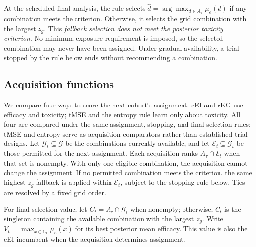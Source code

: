 \documentclass[11pt]{article}
\newcommand{\rev}[1]{{#1}}
\begin{document}
At the scheduled final analysis, the rule selects \rev{$\hat d=\arg\max_{d\in A_\tau}\mu_e(d)$} if any combination meets the criterion. Otherwise, it selects the grid combination with the largest $z_g$. This \emph{fallback selection does not meet the posterior toxicity criterion}. No minimum-exposure requirement is imposed, so the selected combination may never have been assigned. \rev{Under gradual availability, a trial stopped by the rule below ends without recommending a combination.}

\subsection{\rev{Acquisition functions}}\label{sec:policies}

We compare four ways to score the next cohort's assignment. cEI and cKG use efficacy and toxicity; tMSE and the entropy rule learn only about toxicity. \rev{All four are compared under the same assignment, stopping, and final-selection rules; tMSE and entropy serve as acquisition comparators rather than established trial designs.} \rev{Let $\mathcal G_t\subseteq\mathcal G$ be the combinations currently available}, and let $\mathcal E_t\subseteq\mathcal G_t$ be those permitted for the next assignment. Each acquisition ranks $A_\tau\cap\mathcal E_t$ when that set is nonempty. With only one eligible combination, the acquisition cannot change the assignment. \rev{If no permitted combination meets the criterion, the same highest-$z_g$ fallback is applied within $\mathcal E_t$, subject to the stopping rule below.} Ties are resolved by a fixed grid order.

\rev{For final-selection value, let $C_t=A_\tau\cap\mathcal G_t$ when nonempty; otherwise, $C_t$ is the singleton containing the available combination with the largest $z_g$. Write $V_t=\max_{x\in C_t}\mu_e(x)$ for its best posterior mean efficacy. This value is also the cEI incumbent when the acquisition determines assignment.}
\end{document}
